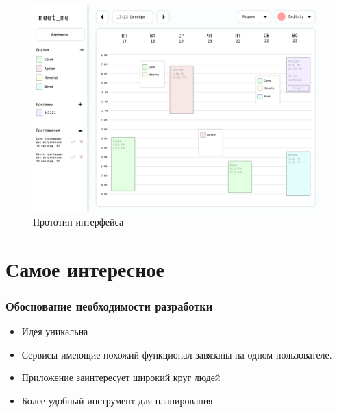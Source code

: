 \documentclass[aspectratio=169]{beamer}
\begin{document}
\begin{frame}
    \begin{figure}
        \includegraphics[scale=.2]{img/prototype.png}
        \caption{Прототип интерфейса}
    \end{figure}
\end{frame}

\section{Самое интересное}
\begin{frame}
\frametitle{Обоснование необходимости разработки}

\begin{itemize}
    \item Идея уникальна 
    \item Сервисы имеющие похожий функционал завязаны на одном пользователе.
    \item Приложение заинтересует широкий круг людей
    \item Более удобный инструмент для планирования
\end{itemize}
\end{frame}


\begin{frame}[plain]
\end{frame}
\end{document}
